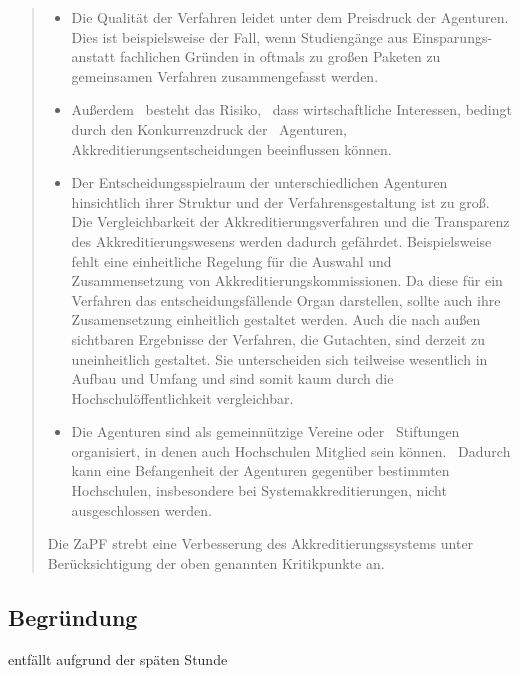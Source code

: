 \documentclass[draft,10pt,oneside]{scrartcl}
\begin{document}
\begin{quote}
	\begin{itemize}
		\item Die Qualität der Verfahren leidet unter dem Preisdruck der
			Agenturen. Dies ist beispielsweise der Fall, wenn Studiengänge aus
			Einsparungs- anstatt fachlichen Gründen in oftmals zu großen Paketen zu
			gemeinsamen Verfahren zusammengefasst werden.
		\item Außerdem  besteht das
			Risiko,  dass wirtschaftliche Interessen, bedingt durch den Konkurrenzdruck
			der  Agenturen, Akkreditierungsentscheidungen beeinflussen können.
		\item Der Entscheidungsspielraum der unterschiedlichen Agenturen
			hinsichtlich ihrer Struktur und der Verfahrensgestaltung ist zu
			groß. Die Vergleichbarkeit der Akkreditierungsverfahren und die
			Transparenz des Akkreditierungswesens werden dadurch gefährdet.
			Beispielsweise fehlt eine einheitliche Regelung für die Auswahl und 
			Zusammensetzung von Akkreditierungskommissionen. Da diese für ein
			Verfahren das entscheidungsfällende Organ darstellen, sollte auch
			ihre Zusamensetzung einheitlich gestaltet werden. Auch die nach
			außen sichtbaren Ergebnisse der Verfahren, die Gutachten, sind
			derzeit zu uneinheitlich gestaltet. Sie unterscheiden sich teilweise
			wesentlich in Aufbau und Umfang und sind somit kaum durch die
			Hochschulöffentlichkeit vergleichbar.
		\item Die Agenturen sind als
			gemeinnützige Vereine oder  Stiftungen organisiert, in denen
			auch Hochschulen Mitglied sein können.  Dadurch kann eine
			Befangenheit der Agenturen gegenüber bestimmten  Hochschulen,
			insbesondere bei Systemakkreditierungen, nicht  ausgeschlossen
			werden.
	\end{itemize}

	Die ZaPF strebt eine Verbesserung des Akkreditierungssystems unter
	Berücksichtigung der oben genannten Kritikpunkte an.
\end{quote}

\subsection*{Begründung}

entfällt aufgrund der späten Stunde
\end{document}
